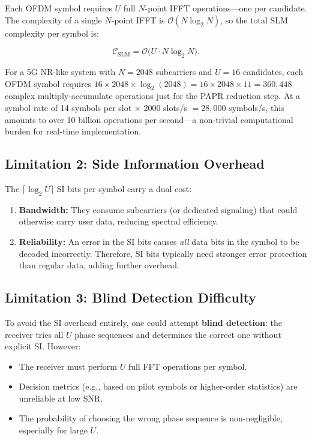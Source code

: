 Each OFDM symbol requires $U$ full $N$-point IFFT operations---one per
candidate.  The complexity of a single $N$-point IFFT is
$\mathcal{O}(N\log_2 N)$, so the total SLM complexity per symbol
is:
\begin{keyresult}
\begin{equation}
    \mathcal{C}_{\mathrm{SLM}} = \mathcal{O}\bigl(U \cdot N\log_2 N\bigr).
\end{equation}
\end{keyresult}

\begin{workingexample}
    For a 5G NR-like system with $N=2048$ subcarriers and $U=16$ candidates,
    each OFDM symbol requires $16 \times 2048 \times \log_2(2048)
    = 16 \times 2048 \times 11 = 360{,}448$ complex multiply-accumulate
    operations just for the PAPR reduction step.  At a symbol rate of
    14 symbols per slot $\times$ 2000 slots/s $= 28{,}000$ symbols/s,
    this amounts to over 10 billion operations per second---a non-trivial
    computational burden for real-time implementation.
\end{workingexample}

\subsection{Limitation 2: Side Information Overhead}

The $\lceil\log_2 U\rceil$ SI bits per symbol carry a dual cost:
\begin{enumerate}
    \item \textbf{Bandwidth:} They consume subcarriers (or dedicated
          signaling) that could otherwise carry user data, reducing
          spectral efficiency.
    \item \textbf{Reliability:} An error in the SI bits causes \emph{all}
          data bits in the symbol to be decoded incorrectly.
          Therefore, SI bits typically need stronger error protection
          than regular data, adding further overhead.
\end{enumerate}

\subsection{Limitation 3: Blind Detection Difficulty}

To avoid the SI overhead entirely, one could attempt \textbf{blind detection}:
the receiver tries all $U$ phase sequences and determines the correct one
without explicit SI.  However:
\begin{itemize}
    \item The receiver must perform $U$ full FFT operations per symbol.
    \item Decision metrics (e.g., based on pilot symbols or higher-order
          statistics) are unreliable at low SNR.
    \item The probability of choosing the wrong phase sequence is
          non-negligible, especially for large $U$.
\end{itemize}


